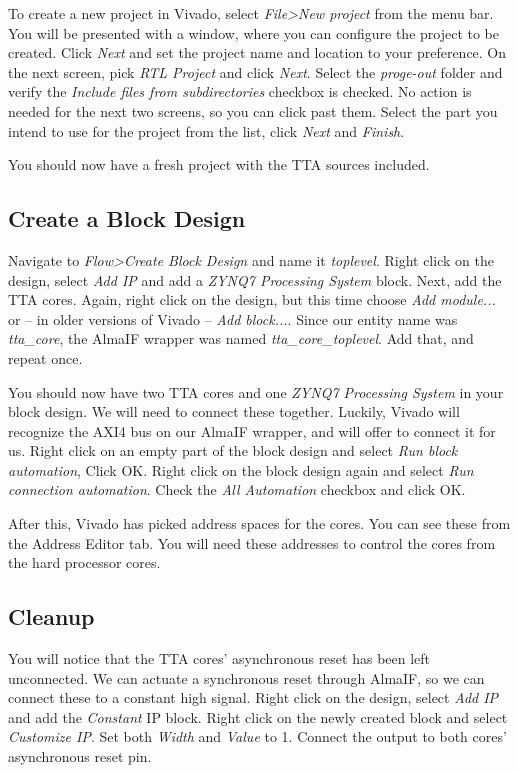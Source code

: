 \documentclass[a4paper,twoside]{tceusermanual}
\begin{document}
To create a new project in Vivado, select \textit{File>New project} from the
menu bar. You will be presented with a window, where you can configure the
project to be created. Click \textit{Next} and set the project name and location
to your preference. On the next screen, pick \textit{RTL Project} and click
\textit{Next}. Select the \textit{proge-out} folder and verify the
\textit{Include files from subdirectories} checkbox is checked. No action is
needed for the next two screens, so you can click past them. Select the part
you intend to use for the project from the list, click \textit{Next} and
\textit{Finish}.

You should now have a fresh project with the TTA sources included.

\subsection{Create a Block Design}

Navigate to \textit{Flow>Create Block Design} and name it \textit{toplevel}.
Right click on the design, select \textit{Add IP} and add a \textit{ZYNQ7
Processing System} block. Next, add the TTA cores. Again, right click on the
design, but this time choose \textit{Add module...} or -- in older versions
of Vivado -- \textit{Add block...}. Since our entity name was
\textit{tta\_core}, the AlmaIF wrapper was named \textit{tta\_core\_toplevel}.
Add that, and repeat once.

You should now have two TTA cores and one \textit{ZYNQ7 Processing System} in
your block design. We will need to connect these together. Luckily, Vivado
will recognize the AXI4 bus on our AlmaIF wrapper, and will offer to connect
it for us. Right click on an empty part of the block design and select
\textit{Run block automation}, Click OK. Right click on the block design again
and select \textit{Run connection automation}. Check  the
\textit{All Automation} checkbox and click OK.

After this, Vivado has picked address spaces for the cores. You can see these
from the Address Editor tab. You will need these addresses to control the cores
from the hard processor cores.

\subsection{Cleanup}

You will notice that the TTA cores' asynchronous reset has been left
unconnected. We can actuate a synchronous reset through AlmaIF, so we can
connect these to a constant high signal. Right click on the design, select
\textit{Add IP} and add the \textit{Constant} IP block. Right click on the
newly created block and select \textit{Customize IP}. Set both \textit{Width}
and \textit{Value} to 1. Connect the output to both cores' asynchronous reset
pin.
\end{document}
